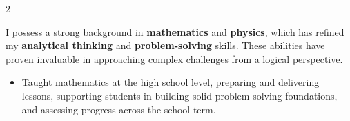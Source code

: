\documentclass[10pt,a4paper,ragged2e,withhyper]{altacv}
\begin{document}
\begin{paracol}{2}




I possess a strong background in \textbf{mathematics} and \textbf{physics}, which has refined my \textbf{analytical thinking} and \textbf{problem-solving} skills. These abilities have proven invaluable in approaching complex challenges from a logical perspective.





\begin{itemize}
\item Taught mathematics at the high school level, preparing and delivering lessons, supporting students in building solid problem-solving foundations, and assessing progress across the school term.
\end{itemize}










\end{paracol}
\end{document}
